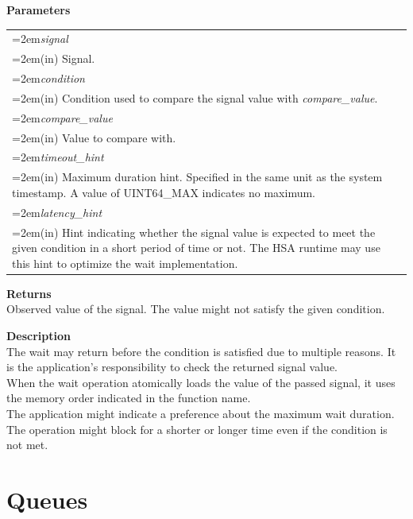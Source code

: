 \documentclass[final]{book}
\newcommand{\hsaarg}[1]{\textit{#1}}
\begin{document}
\noindent\textbf{Parameters}\\[-6mm]
\noindent\begin{longtable}{@{}>{\hangindent=2em}p{\textwidth}}
\hsaarg{signal}\\\hspace{2em}(in) Signal.\\[2mm]
\hsaarg{condition}\\\hspace{2em}(in) Condition used to compare the signal value with \textit{compare_\-value}.\\[2mm]
\hsaarg{compare_\-value}\\\hspace{2em}(in) Value to compare with.\\[2mm]
\hsaarg{timeout_\-hint}\\\hspace{2em}(in) Maximum duration hint. Specified in the same unit as the system timestamp. A value of UINT64_\-MAX indicates no maximum.\\[2mm]
\hsaarg{latency_\-hint}\\\hspace{2em}(in) Hint indicating whether the signal value is expected to meet the given condition in a short period of time or not. The HSA runtime may use this hint to optimize the wait implementation.
\end{longtable}
\vspace{-5mm}\noindent\textbf{Returns}\\[1mm]
Observed value of the signal. The value might not satisfy the given condition.

\noindent\textbf{Description}\\[1mm]
The wait may return before the condition is satisfied due to multiple reasons. It is the application's responsibility to check the returned signal value.\\[2mm]
When the wait operation atomically loads the value of the passed signal, it uses the memory order indicated in the function name.\\[2mm]
The application might indicate a preference about the maximum wait duration. The operation might block for a shorter or longer time even if the condition is not met. 


 

\section{Queues} \label{sec:queues}
\end{document}
